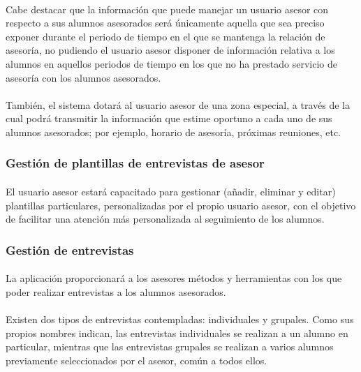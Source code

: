      \paragraph{}Cabe destacar que la información que puede manejar un usuario
      asesor con respecto a sus alumnos asesorados será únicamente aquella
      que sea preciso exponer durante el periodo de tiempo en el que se mantenga
      la relación de asesoría, no pudiendo el usuario asesor disponer
      de información relativa a los alumnos en aquellos periodos de tiempo en
      los que no ha prestado servicio de asesoría con los alumnos asesorados.

      \paragraph{}También, el sistema dotará al usuario asesor de una
      zona especial, a través de la cual podrá transmitir la información que
      estime oportuno a cada uno de sus alumnos asesorados; por ejemplo, horario
      de asesoría, próximas reuniones, etc.

      \subsubsection{Gestión de plantillas de entrevistas de asesor}

      \paragraph{}El usuario asesor estará capacitado para gestionar
      (añadir, eliminar y editar) plantillas particulares, personalizadas
      por el propio usuario asesor, con el objetivo de facilitar una atención
      más personalizada al seguimiento de los alumnos.

      \subsubsection{Gestión de entrevistas}

      \paragraph{}La aplicación proporcionará a los asesores métodos y
      herramientas con los que poder realizar entrevistas a los alumnos
      asesorados.

      \paragraph{}Existen dos tipos de entrevistas contempladas: individuales y
      grupales. Como sus propios nombres indican, las entrevistas individuales
      se realizan a un alumno en particular, mientras que las entrevistas
      grupales se realizan a varios alumnos previamente seleccionados por el
      asesor, común a todos ellos.

